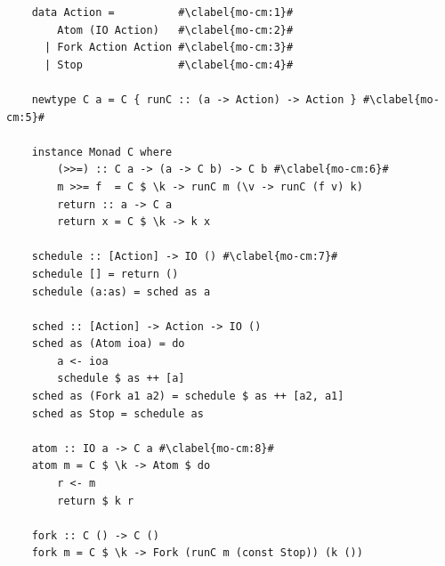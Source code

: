 \begin{code}
  \begin{verbatim}
    data Action =          #\clabel{mo-cm:1}#
        Atom (IO Action)   #\clabel{mo-cm:2}# 
      | Fork Action Action #\clabel{mo-cm:3}# 
      | Stop               #\clabel{mo-cm:4}# 
    
    newtype C a = C { runC :: (a -> Action) -> Action } #\clabel{mo-cm:5}#
    
    instance Monad C where
        (>>=) :: C a -> (a -> C b) -> C b #\clabel{mo-cm:6}#
        m >>= f  = C $ \k -> runC m (\v -> runC (f v) k)
        return :: a -> C a
        return x = C $ \k -> k x
    
    schedule :: [Action] -> IO () #\clabel{mo-cm:7}#
    schedule [] = return ()
    schedule (a:as) = sched as a
    
    sched :: [Action] -> Action -> IO ()
    sched as (Atom ioa) = do
        a <- ioa
        schedule $ as ++ [a] 
    sched as (Fork a1 a2) = schedule $ as ++ [a2, a1]
    sched as Stop = schedule as
    
    atom :: IO a -> C a #\clabel{mo-cm:8}#
    atom m = C $ \k -> Atom $ do
        r <- m
        return $ k r
    
    fork :: C () -> C ()
    fork m = C $ \k -> Fork (runC m (const Stop)) (k ())
  \end{verbatim}
  \label{b:mo:c2}
\end{code}


